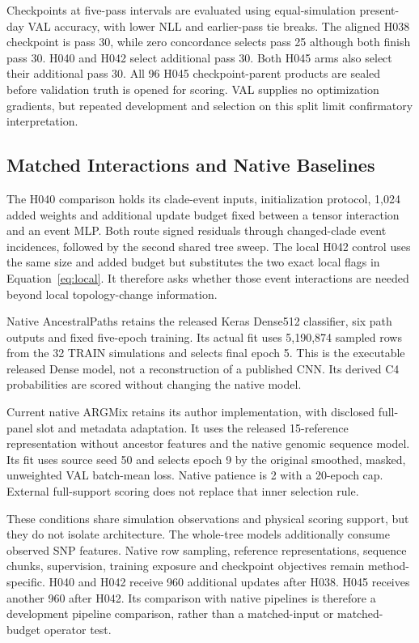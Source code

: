 \documentclass[letterpaper]{article}
\begin{document}
Checkpoints at five-pass intervals are evaluated using equal-simulation present-day VAL accuracy, with lower NLL and earlier-pass tie breaks. The aligned H038 checkpoint is pass 30, while zero concordance selects pass 25 although both finish pass 30. H040 and H042 select additional pass 30. Both H045 arms also select their additional pass 30. All 96 H045 checkpoint-parent products are sealed before validation truth is opened for scoring. VAL supplies no optimization gradients, but repeated development and selection on this split limit confirmatory interpretation.

\subsection{Matched Interactions and Native Baselines}
The H040 comparison holds its clade-event inputs, initialization protocol, 1,024 added weights and additional update budget fixed between a tensor interaction and an event MLP. Both route signed residuals through changed-clade event incidences, followed by the second shared tree sweep. The local H042 control uses the same size and added budget but substitutes the two exact local flags in Equation~\ref{eq:local}. It therefore asks whether those event interactions are needed beyond local topology-change information.

Native AncestralPaths retains the released Keras Dense512 classifier, six path outputs and fixed five-epoch training. Its actual fit uses 5,190,874 sampled rows from the 32 TRAIN simulations and selects final epoch 5. This is the executable released Dense model, not a reconstruction of a published CNN. Its derived C4 probabilities are scored without changing the native model.

Current native ARGMix retains its author implementation, with disclosed full-panel slot and metadata adaptation. It uses the released 15-reference representation without ancestor features and the native genomic sequence model. Its fit uses source seed 50 and selects epoch 9 by the original smoothed, masked, unweighted VAL batch-mean loss. Native patience is 2 with a 20-epoch cap. External full-support scoring does not replace that inner selection rule.

These conditions share simulation observations and physical scoring support, but they do not isolate architecture. The whole-tree models additionally consume observed SNP features. Native row sampling, reference representations, sequence chunks, supervision, training exposure and checkpoint objectives remain method-specific. H040 and H042 receive 960 additional updates after H038. H045 receives another 960 after H042. Its comparison with native pipelines is therefore a development pipeline comparison, rather than a matched-input or matched-budget operator test.
\end{document}
